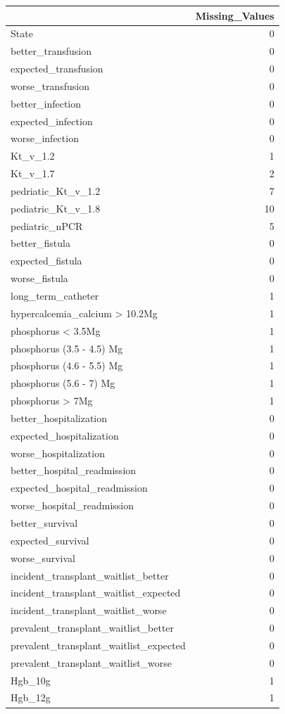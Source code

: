 \documentclass[
  letterpaper,
  DIV=11,
  numbers=noendperiod]{scrreprt}
\begin{document}
\begin{table}
\centering
\begin{tabular}[t]{l|r}
\hline
  & Missing\_Values\\
\hline
State & 0\\
\hline
better\_transfusion & 0\\
\hline
expected\_transfusion & 0\\
\hline
worse\_transfusion & 0\\
\hline
better\_infection & 0\\
\hline
expected\_infection & 0\\
\hline
worse\_infection & 0\\
\hline
Kt\_v\_1.2 & 1\\
\hline
Kt\_v\_1.7 & 2\\
\hline
pedriatic\_Kt\_v\_1.2 & 7\\
\hline
pediatric\_Kt\_v\_1.8 & 10\\
\hline
pediatric\_nPCR & 5\\
\hline
better\_fistula & 0\\
\hline
expected\_fistula & 0\\
\hline
worse\_fistula & 0\\
\hline
long\_term\_catheter & 1\\
\hline
hypercalcemia\_calcium > 10.2Mg & 1\\
\hline
phosphorus < 3.5Mg & 1\\
\hline
phosphorus (3.5 - 4.5) Mg & 1\\
\hline
phosphorus (4.6 - 5.5) Mg & 1\\
\hline
phosphorus (5.6 - 7) Mg & 1\\
\hline
phosphorus > 7Mg & 1\\
\hline
better\_hospitalization & 0\\
\hline
expected\_hospitalization & 0\\
\hline
worse\_hospitalization & 0\\
\hline
better\_hospital\_readmission & 0\\
\hline
expected\_hospital\_readmission & 0\\
\hline
worse\_hospital\_readmission & 0\\
\hline
better\_survival & 0\\
\hline
expected\_survival & 0\\
\hline
worse\_survival & 0\\
\hline
incident\_transplant\_waitlist\_better & 0\\
\hline
incident\_transplant\_waitlist\_expected & 0\\
\hline
incident\_transplant\_waitlist\_worse & 0\\
\hline
prevalent\_transplant\_waitlist\_better & 0\\
\hline
prevalent\_transplant\_waitlist\_expected & 0\\
\hline
prevalent\_transplant\_waitlist\_worse & 0\\
\hline
Hgb\_10g & 1\\
\hline
Hgb\_12g & 1\\
\hline
\end{tabular}
\end{table}
\end{document}
